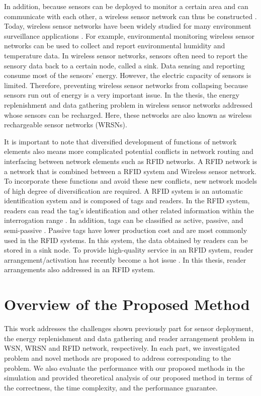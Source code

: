 In addition, because sensors can be deployed to monitor a certain area and can
communicate with each other, a wireless sensor network can thus be
constructed \cite{IEEE1,IEEE2,IEEE3,IEEE4}. Today, wireless sensor
networks have been widely studied for many environment surveillance
applications \cite{ACM14,ACM15,ACM16}. For example,
environmental monitoring wireless sensor networks \cite{IEEE5} can
be used to collect and report environmental humidity and temperature
data. In wireless sensor networks, sensors often need to report the
sensory data back to a certain node, called a sink. Data sensing and
reporting consume most of the sensors' energy. However, the electric
capacity of sensors is limited. Therefore, preventing wireless
sensor networks from collapsing because sensors run out of energy is
a very important issue. In the thesis, the energy
replenishment and data gathering problem in wireless sensor networks addressed whose
sensors can be recharged. Here, these networks are also known as
wireless rechargeable sensor networks (WRSNs).


It is important to note that diversified development of functions of network elements also means more
complicated potential conflicts in network routing and interfacing between
network elements such as RFID networks.
A RFID network is a network that is combined between a RFID system and Wireless sensor network.
To incorporate these functions and avoid these new conflicts,
new network models of high degree of diversification are required.
A RFID system is an automatic identification
system and is composed of tags and readers. In the RFID system,
readers can read the tag's identification and other related
information within the interrogation range \cite{reader1,reader2}.
In addition, tags can be classified as active, passive, and
semi-passive \cite{tag1,tag2}. Passive tags have lower production
cost and are most commonly used in the RFID systems. In this system,
the data obtained by readers can be stored in a sink node. To
provide high-quality service in an RFID system, reader
arrangement/activation has recently become a hot issue \cite{d1,d2}.
In this thesis, reader arrangements also addressed in an RFID system.


\section{Overview of the Proposed Method}

This work addresses the challenges shown previously part for sensor deployment,
the energy replenishment and data gathering and reader arrangement problem
in WSN, WRSN and RFID network, respectively.
In each part, we investigated problem and novel methods are proposed to
address corresponding to the problem. We also evaluate the performance with
our proposed methods in the simulation and provided theoretical analysis
of our proposed method in terms of the correctness, the time complexity,
and the performance guarantee.

